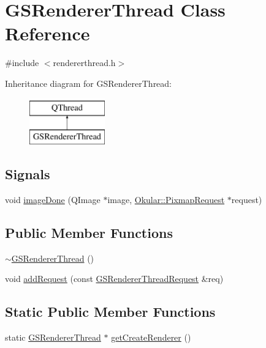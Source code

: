 \hypertarget{classGSRendererThread}{\section{G\+S\+Renderer\+Thread Class Reference}
\label{classGSRendererThread}
}


{\ttfamily \#include $<$rendererthread.\+h$>$}

Inheritance diagram for G\+S\+Renderer\+Thread\+:\begin{figure}[H]
\begin{center}
\leavevmode
\includegraphics[height=2.000000cm]{classGSRendererThread}
\end{center}
\end{figure}
\subsection*{Signals}
\begin{DoxyCompactItemize}
\item 
void \hyperlink{classGSRendererThread_a4babeac5daa2a6caa990a8c6be568579}{image\+Done} (Q\+Image $\ast$image, \hyperlink{classOkular_1_1PixmapRequest}{Okular\+::\+Pixmap\+Request} $\ast$request)
\end{DoxyCompactItemize}
\subsection*{Public Member Functions}
\begin{DoxyCompactItemize}
\item 
\hyperlink{classGSRendererThread_a6f945d6dd756e799854c34ca40da36b1}{$\sim$\+G\+S\+Renderer\+Thread} ()
\item 
void \hyperlink{classGSRendererThread_aece7094dd18ae8138f09e26cdbf2638c}{add\+Request} (const \hyperlink{structGSRendererThreadRequest}{G\+S\+Renderer\+Thread\+Request} \&req)
\end{DoxyCompactItemize}
\subsection*{Static Public Member Functions}
\begin{DoxyCompactItemize}
\item 
static \hyperlink{classGSRendererThread}{G\+S\+Renderer\+Thread} $\ast$ \hyperlink{classGSRendererThread_a5fc474e6996377c9d2ae9f8dd60dd786}{get\+Create\+Renderer} ()
\end{DoxyCompactItemize}


